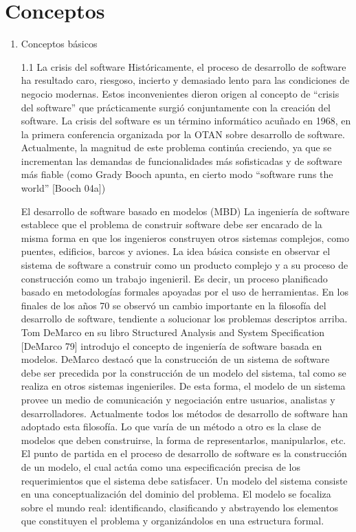 \section{Conceptos} 

\begin{enumerate}[1.Desarrollo de Software Dirigido por Modelos]
	\item  Conceptos básicos

1.1	La crisis del software
Históricamente, el proceso de desarrollo de software ha resultado caro, riesgoso, incierto y demasiado lento para las condiciones de negocio modernas. Estos inconvenientes dieron origen al concepto de “crisis del software” que prácticamente surgió conjuntamente con la creación del software. La crisis del software es un término informático acuñado en 1968, en la primera conferencia organizada por la OTAN sobre desarrollo de software.
Actualmente, la magnitud de este problema continúa creciendo, ya que se incrementan las demandas de funcionalidades más sofisticadas y de software más fiable (como Grady Booch apunta, en cierto modo “software runs the world” [Booch 04a])

El desarrollo de software basado en modelos (MBD)
La ingeniería de software establece que el problema de construir software debe ser encarado de la misma forma en que los ingenieros construyen otros sistemas complejos, como puentes, edificios, barcos y aviones. La idea básica consiste en observar el sistema de software a construir como un producto complejo y a su proceso de construcción como un trabajo ingenieril. Es decir, un proceso planificado basado en metodologías formales apoyadas por el uso de herramientas. 
En los finales de los años 70 se observó un cambio importante en la filosofía del desarrollo de software, tendiente a solucionar los problemas descriptos arriba. Tom DeMarco en su libro Structured Analysis and System Specification [DeMarco 79] introdujo el concepto de ingeniería de software basada en modelos. DeMarco destacó que la construcción de un sistema de software debe ser precedida por la construcción de un modelo del sistema, tal como se realiza en otros sistemas ingenieriles. De esta forma, el modelo de un sistema provee un medio de comunicación y negociación entre usuarios, analistas y desarrolladores. Actualmente todos los métodos de desarrollo de software han adoptado esta filosofía. Lo que varía de un método a otro es la clase de modelos que deben construirse, la forma de representarlos, manipularlos, etc. El punto de partida en el proceso de desarrollo de software es la construcción de un modelo, el cual actúa como una especificación precisa de los requerimientos que el sistema debe satisfacer.  Un modelo del sistema consiste en una conceptualización del dominio del problema. El modelo  se focaliza sobre el mundo real: identificando, clasificando y abstrayendo los elementos que constituyen el problema y organizándolos en una estructura formal. 
 

\end{enumerate}
